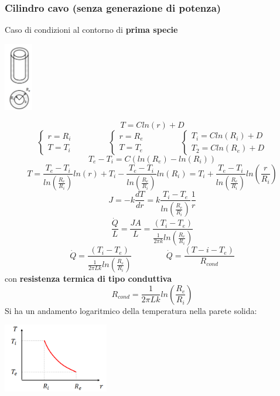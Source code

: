 \subsubsection{Cilindro cavo (senza generazione di potenza)}
Caso di condizioni al contorno di \textbf{prima specie}
\begin{center}
    \includegraphics[height=3cm]{../L10/img7.PNG}
\end{center}
\[
    T= C ln(r) + D
\]
\[
    \begin{cases}
        r = R_i \\ T = T_i
    \end{cases} \;\;\;\;\;\;\;\;\;\;\;\;\;\;\;\begin{cases}
        r= R_e \\ T=T_e 
    \end{cases}\;\;\;\;\;\;\;\;\;\;\;\;\;\;\; \begin{cases}
        T_i = C ln(R_i) + D \\ T_2 = C ln (R_e) + D
    \end{cases}
\]
\[
    T_e-T_i = C(ln(R_e) - ln(R_i))
\]
\[
    T= \frac{T_e-T_i}{ln\left(\frac{R_e}{R_i}\right)}ln(r) + T_i - \frac{T_e-T_i}{ln\left(\frac{R_e}{R_i}\right)}ln(R_i) = T_i + \frac{T_e-T_i}{ln\left(\frac{R_e}{R_i}\right)}ln\left(\frac{r}{R_i}\right)
\]
\[
    J = -k \frac{dT}{dr} = k \frac{T_i-T_e}{ln\left(\frac{R_e}{R_i}\right)} \frac{1}{r}
\]
\[
    \frac{\dot{Q}}{L} = \frac{JA}{L} = \frac{(T_i-T_e)}{\frac{1}{2\pi k}ln\left(\frac{R_e}{R_i}\right)}
\]
\[
    \dot{Q} = \frac{(T_i-T_e)}{\frac{1}{2\pi L k}ln\left(\frac{R_e}{R_i}\right)} \;\;\;\;\;\;\;\;\;\;\;\;\;\;\; \dot{Q} = \frac{(T-i-T_e)}{R_{cond}}
\]
con \textbf{resistenza termica di tipo conduttiva}
\[
    R_{cond} = \frac{1}{2 \pi L k}ln\left(\frac{R_e}{R_i}\right)
\]
Si ha un andamento logaritmico della temperatura nella parete solida:
\begin{center}
    \includegraphics[height=3cm]{../L10/img8.PNG}
\end{center}
